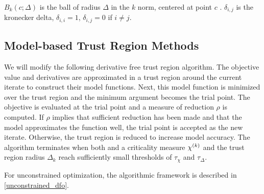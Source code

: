 $B_k(c; \Delta)$ is the ball of radius $\Delta$ in the $k$ norm, centered at point $c$ .
$\delta_{i,j}$ is the kronecker delta, $\delta_{i,i} = 1$, $\delta_{i,j} = 0$ if $i\ne j$.


\subsection{Model-based Trust Region Methods}

We will modify the following derivative free trust region algorithm.
The objective value and derivatives are approximated in a trust region around the current iterate to construct their model functions.
Next, this model function is minimized over the trust region and the minimum argument becomes the trial point.
The objective is evaluated at the trial point and a measure of reduction $\rho$ is computed.
If $\rho$ implies that sufficient reduction has been made and that the model approximates the function well, the trial point is accepted as the new iterate.
Otherwise, the trust region is reduced to increase model accuracy.
The algorithm terminates when both and a criticality measure ${\chi^{(k)}}$ and the trust region radius $\Delta_k$ reach sufficiently small thresholds of $\tau_{\chi}$ and $\tau_{\Delta}$.


For unconstrained optimization, the algorithmic framework is described in \cref{unconstrained_dfo}.

